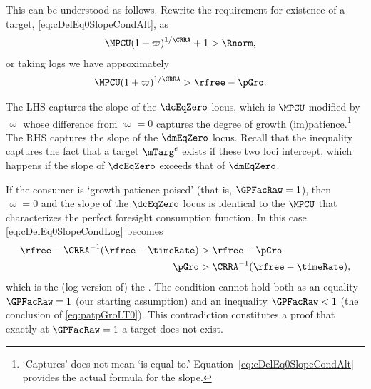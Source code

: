\documentclass{\handout}
\begin{document}
This can be understood as follows.  Rewrite the requirement for existence of a target, \eqref{eq:cDelEq0SlopeCondAlt}, as 
\begin{equation}\begin{gathered}\begin{aligned}
  \MPCU (1+\varpi)^{1/\CRRA}+1 & >   \Rnorm  \label{eq:cDelEq0SlopeCondAltAlt}
,\end{aligned}\end{gathered}\end{equation}
or taking logs we have approximately 
\begin{equation}\begin{gathered}\begin{aligned}
  \MPCU (1+\varpi)^{1/\CRRA} & >   \rfree-\pGro \label{eq:cDelEq0SlopeCondLog}
.\end{aligned}\end{gathered}\end{equation}

The LHS captures the slope of the $\dcEqZero$ locus, which is $\MPCU$ modified by $\varpi$ whose difference from $\varpi=0$ captures the degree of growth (im)patience.\footnote{`Captures' does not mean `is equal to.'  Equation~\eqref{eq:cDelEq0SlopeCondAlt} provides the actual formula for the slope.}  The RHS captures the slope of the $\dmEqZero$ locus.  Recall that the inequality captures the fact that a target $\mTarg^{e}$ exists if these two loci intercept, which happens if the slope of $\dcEqZero$ exceeds that of $\dmEqZero$.

If the consumer is `growth patience poised' (that is, $\GPFacRaw = 1$), then $\varpi = 0$ and the slope of the $\dcEqZero$ locus is identical to the $\MPCU$ that characterizes the perfect foresight consumption function.  In this case \eqref{eq:cDelEq0SlopeCondLog} becomes
\begin{equation}\begin{gathered}\begin{aligned}
  \rfree-\CRRA^{-1}(\rfree-\timeRate) & >   \rfree-\pGro
\\ \pGro & >  \CRRA^{-1}(\rfree-\timeRate) \label{eq:patpGroLT0}
,\end{aligned}\end{gathered}\end{equation}
which is the (log version of) the \GICPGro.  The condition cannot hold both as an equality $\GPFacRaw=1$ (our starting assumption) and an inequality $\GPFacRaw < 1$ (the conclusion of \eqref{eq:patpGroLT0}).  This contradiction constitutes a proof that exactly at $\GPFacRaw=1$ a target does not exist.
\end{document}
